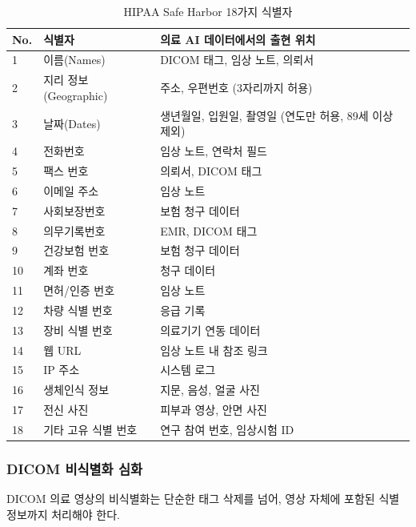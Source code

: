 \begin{table}[htbp]
\centering
\caption{HIPAA Safe Harbor 18가지 식별자}
\label{tab:16_hipaa_18}
\begin{tabularx}{\textwidth}{p{0.5cm}p{3.5cm}X}
\toprule
\textbf{No.} & \textbf{식별자} & \textbf{의료 AI 데이터에서의 출현 위치} \\
\midrule
1 & 이름(Names) & DICOM 태그, 임상 노트, 의뢰서 \\
2 & 지리 정보(Geographic) & 주소, 우편번호 (3자리까지 허용) \\
3 & 날짜(Dates) & 생년월일, 입원일, 촬영일 (연도만 허용, 89세 이상 제외) \\
4 & 전화번호 & 임상 노트, 연락처 필드 \\
5 & 팩스 번호 & 의뢰서, DICOM 태그 \\
6 & 이메일 주소 & 임상 노트 \\
7 & 사회보장번호 & 보험 청구 데이터 \\
8 & 의무기록번호 & EMR, DICOM 태그 \\
9 & 건강보험 번호 & 보험 청구 데이터 \\
10 & 계좌 번호 & 청구 데이터 \\
11 & 면허/인증 번호 & 임상 노트 \\
12 & 차량 식별 번호 & 응급 기록 \\
13 & 장비 식별 번호 & 의료기기 연동 데이터 \\
14 & 웹 URL & 임상 노트 내 참조 링크 \\
15 & IP 주소 & 시스템 로그 \\
16 & 생체인식 정보 & 지문, 음성, 얼굴 사진 \\
17 & 전신 사진 & 피부과 영상, 안면 사진 \\
18 & 기타 고유 식별 번호 & 연구 참여 번호, 임상시험 ID \\
\bottomrule
\end{tabularx}
\end{table}

\subsubsection{DICOM 비식별화 심화}

DICOM 의료 영상의 비식별화는 단순한 태그 삭제를 넘어, 영상 자체에 포함된 식별 정보까지 처리해야 한다.

